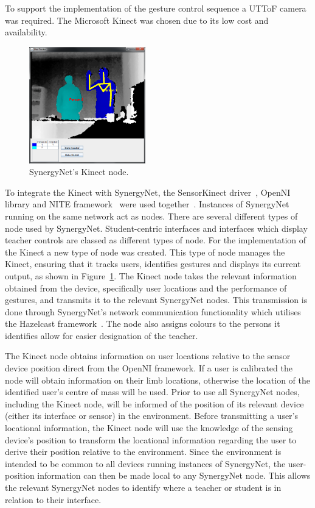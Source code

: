\documentclass[manuscript, review, screen]{acmart}
\begin{document}
To support the implementation of the gesture control sequence a \ac{UTToF} camera was required.
The Microsoft Kinect was chosen due to its low cost and availability.

\begin{figure}[h]
   \centering
   \includegraphics[width=0.45\textwidth]{figures/kinect_node.png}
   \caption{SynergyNet's Kinect node.}
   \label{fig:kinectNode}
\end{figure}

To integrate the Kinect with SynergyNet, the SensorKinect driver~\cite{Avin2011}, OpenNI library and NITE framework~\cite{Organisation2011} were used together~\cite{Davison2012}.
Instances of SynergyNet running on the same network act as nodes.
There are several different types of node used by SynergyNet.
Student-centric interfaces and interfaces which display teacher controls are classed as different types of node.
For the implementation of the Kinect a new type of node was created.
This type of node manages the Kinect, ensuring that it tracks users, identifies gestures and displays its current output, as shown in Figure~\ref{fig:kinectNode}.
The Kinect node takes the relevant information obtained from the device, specifically user locations and the performance of gestures, and transmits it to the relevant SynergyNet nodes.
This transmission is done through SynergyNet's network communication functionality which utilises the Hazelcast framework~\cite{Hazelcast2009}.
The node also assigns colours to the persons it identifies allow for easier designation of the teacher.

The Kinect node obtains information on user locations relative to the sensor device position direct from the OpenNI framework.
If a user is calibrated the node will obtain information on their limb locations, otherwise the location of the identified user's centre of mass will be used.
Prior to use all SynergyNet nodes, including the Kinect node, will be informed of the position of its relevant device (either its interface or sensor) in the environment.
Before transmitting a user's locational information, the Kinect node will use the knowledge of the sensing device's position to transform the locational information regarding the user to derive their position relative to the environment.
Since the environment is intended to be common to all devices running instances of SynergyNet, the user-position information can then be made local to any SynergyNet node.
This allows the relevant SynergyNet nodes to identify where a teacher or student is in relation to their interface.
\end{document}
